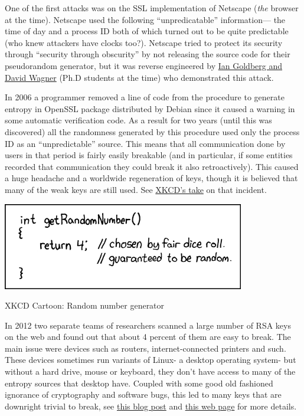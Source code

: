 One of the first attacks was on the SSL implementation of Netscape
(\emph{the} browser at the time). Netscape used the following
``unpredicatable'' information--- the time of day and a process ID both
of which turned out to be quite predictable (who knew attackers have
clocks too?). Netscape tried to protect its security through ``security
through obscurity'' by not releasing the source code for their
pseudorandom generator, but it was reverse engineered by
\href{https://www.cs.berkeley.edu/~daw/papers/ddj-netscape.html}{Ian
Goldberg and David Wagner} (Ph.D students at the time) who demonstrated
this attack.

In 2006 a programmer removed a line of code from the procedure to
generate entropy in OpenSSL package distributed by Debian since it
caused a warning in some automatic verification code. As a result for
two years (until this was discovered) all the randomness generated by
this procedure used only the process ID as an ``unpredictable'' source.
This means that all communication done by users in that period is fairly
easily breakable (and in particular, if some entities recorded that
communication they could break it also retroactively). This caused a
huge headache and a worldwide regeneration of keys, though it is
believed that many of the weak keys are still used. See
\href{http://www.xkcd.com/424/}{XKCD's take} on that incident.

\begin{marginfigure}
\centering
\includegraphics[width=\linewidth, height=1.5in, keepaspectratio]{../figure/random_number.png}
\caption{XKCD Cartoon: Random number generator}
\label{tmplabelfig}
\end{marginfigure}

In 2012 two separate teams of researchers scanned a large number of RSA
keys on the web and found out that about 4 percent of them are easy to
break. The main issue were devices such as routers, internet-connected
printers and such. These devices sometimes run variants of Linux- a
desktop operating system- but without a hard drive, mouse or keyboard,
they don't have access to many of the entropy sources that desktop have.
Coupled with some good old fashioned ignorance of cryptography and
software bugs, this led to many keys that are downright trivial to
break, see
\href{https://freedom-to-tinker.com/blog/nadiah/new-research-theres-no-need-panic-over-factorable-keys-just-mind-your-ps-and-qs/}{this
blog post} and \href{https://factorable.net/}{this web page} for more
details.

